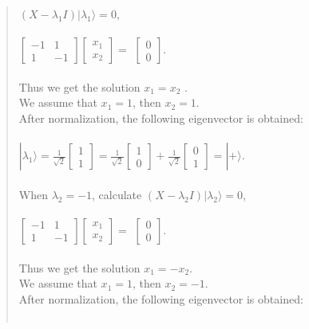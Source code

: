 \documentclass[UTF8]{ctexart}
\begin{document}
\begin{quote}
    	$(X-\lambda_{1} I )|\lambda_{1}\rangle=0$, \\  \\
	$\begin{bmatrix}-1&1\\1&-1\end{bmatrix}\begin{bmatrix}x_{1}\\x_{2}\end{bmatrix}=$
	$\begin{bmatrix}0\\0\end{bmatrix}$. \\  \\ 
	Thus we get the solution $x_{1}=x_{2}$ .\\ 
	We  assume that $x_{1}=1$, then $x_{2}=1$.  \\ 
	After normalization, the following eigenvector is obtained:\\  \\
	$|\lambda_{1}\rangle=\frac{1}{\sqrt{2}}\begin{bmatrix}1\\1\end{bmatrix}
	=\frac{1}{\sqrt{2}}\begin{bmatrix}1\\0\end{bmatrix}+\frac{1}{\sqrt{2}}\begin{bmatrix}0\\1\end{bmatrix}
	=|+\rangle$. \\  \\
	When $\lambda_{2}=-1$, calculate
	$(X-\lambda_{2} I)|\lambda_{2}\rangle=0$, \\  \\
	$\begin{bmatrix}-1&1\\1&-1\end{bmatrix}\begin{bmatrix}x_{1}\\x_{2}\end{bmatrix}=$
	$\begin{bmatrix}0\\0\end{bmatrix}$. \\  \\ 
	Thus we get the solution $x_{1}=-x_{2}$.\\ 
	We  assume that $x_{1}=1$, then $x_{2}=-1$.  \\
	After normalization, the following eigenvector is obtained:\\  \\

\end{quote}
\end{document}
